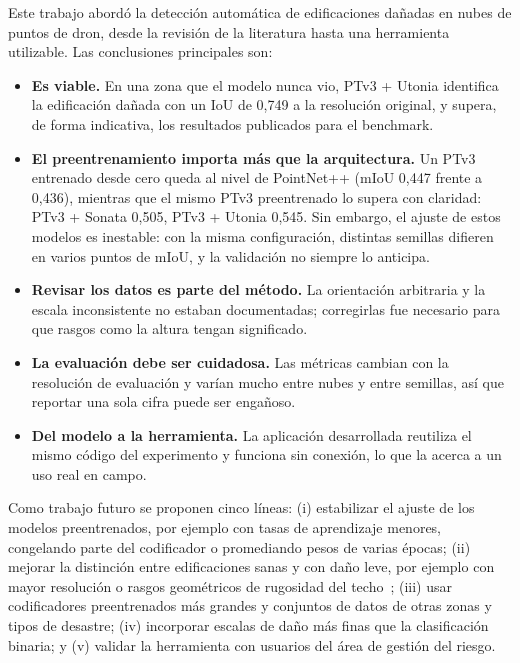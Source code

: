 \documentclass[5p]{elsarticle}
\begin{document}
Este trabajo abordó la detección automática de edificaciones dañadas en nubes de puntos de dron, desde la revisión de la literatura hasta una herramienta utilizable. Las conclusiones principales son:
\begin{itemize}
    \item \textbf{Es viable.} En una zona que el modelo nunca vio, PTv3 + Utonia identifica la edificación dañada con un IoU de 0,749 a la resolución original, y supera, de forma indicativa, los resultados publicados para el benchmark.
    \item \textbf{El preentrenamiento importa más que la arquitectura.} Un PTv3 entrenado desde cero queda al nivel de PointNet++ (mIoU 0,447 frente a 0,436), mientras que el mismo PTv3 preentrenado lo supera con claridad: PTv3 + Sonata 0,505, PTv3 + Utonia 0,545. Sin embargo, el ajuste de estos modelos es inestable: con la misma configuración, distintas semillas difieren en varios puntos de mIoU, y la validación no siempre lo anticipa.
    \item \textbf{Revisar los datos es parte del método.} La orientación arbitraria y la escala inconsistente no estaban documentadas; corregirlas fue necesario para que rasgos como la altura tengan significado.
    \item \textbf{La evaluación debe ser cuidadosa.} Las métricas cambian con la resolución de evaluación y varían mucho entre nubes y entre semillas, así que reportar una sola cifra puede ser engañoso.
    \item \textbf{Del modelo a la herramienta.} La aplicación desarrollada reutiliza el mismo código del experimento y funciona sin conexión, lo que la acerca a un uso real en campo.
\end{itemize}

Como trabajo futuro se proponen cinco líneas: (i) estabilizar el ajuste de los modelos preentrenados, por ejemplo con tasas de aprendizaje menores, congelando parte del codificador o promediando pesos de varias épocas; (ii) mejorar la distinción entre edificaciones sanas y con daño leve, por ejemplo con mayor resolución o rasgos geométricos de rugosidad del techo~\cite{Bolourian2023}; (iii) usar codificadores preentrenados más grandes y conjuntos de datos de otras zonas y tipos de desastre; (iv) incorporar escalas de daño más finas que la clasificación binaria; y (v) validar la herramienta con usuarios del área de gestión del riesgo.
\end{document}
